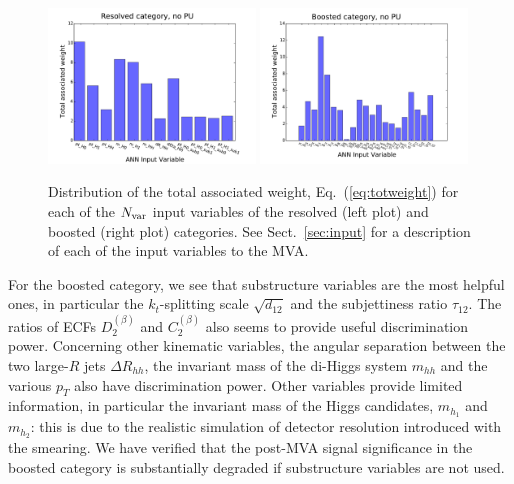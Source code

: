 \begin{figure}[t]
\begin{center}
\includegraphics[width=0.49\textwidth]{plots/res_wgthist_noPU.pdf}
\includegraphics[width=0.49\textwidth]{plots/bst_wgthist_noPU.pdf}
\vspace{-0.5cm}
\caption{\small
Distribution of the total associated weight,
Eq.~(\ref{eq:totweight}) for each of the $N_{\rm var}$ input
variables of the resolved (left plot) and boosted (right plot) categories.
%
See Sect.~\ref{sec:input} for a description of each of the input
variables to the MVA.
}
\label{fig:nnweights}
\end{center}
\end{figure}




For the boosted category, we see that substructure variables
are the most helpful ones, in particular the $k_t$-splitting scale
$\sqrt{d_{12}}$ and the subjettiness ratio $\tau_{12}$.
%
The ratios of ECFs $D_2^{(\beta)}$ and
$C_2^{(\beta)}$ also seems to provide
useful discrimination power.
%
Concerning other kinematic variables, the angular
separation between the two large-$R$ jets $\Delta R_{hh}$,
the invariant mass of the di-Higgs system $m_{hh}$ and the various
$p_T$ also have discrimination power.
%
Other variables provide limited information, in particular the invariant
mass of the Higgs candidates, $m_{h_1}$ and $m_{h_2}$: this
is due to the realistic
simulation of detector resolution introduced with the smearing.
%
We have verified that the post-MVA
signal significance in the boosted category is substantially
degraded if substructure variables are not used.

